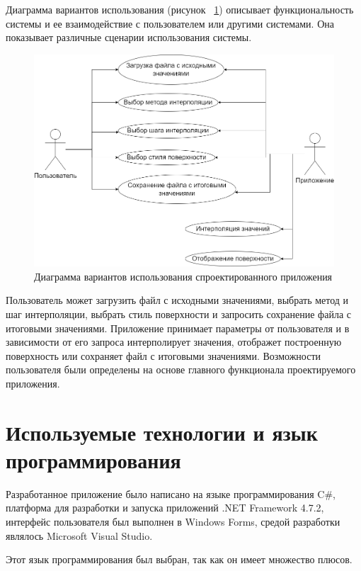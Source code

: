 Диаграмма вариантов использования (рисунок ~\ref{fig:13}) описывает функциональность системы и ее взаимодействие с пользователем или другими системами. Она показывает различные сценарии использования системы. 

\begin{figure}[h!]
    \center
    \includegraphics[scale=0.5]{images/Диаграмма вариантов использования.png}
    \caption{Диаграмма вариантов использования спроектированного приложения}
    \label{fig:13}
\end{figure}

Пользователь может загрузить файл с исходными значениями, выбрать метод и шаг интерполяции, выбрать стиль поверхности и запросить сохранение файла с итоговыми значениями. Приложение принимает параметры от пользователя и в зависимости от его запроса интерполирует значения, отображет построенную поверхность или сохраняет файл с итоговыми значениями. Возможности пользователя были определены на основе главного функционала проектируемого приложения.


\section{Используемые технологии и язык программирования}

Разработанное приложение было написано на языке программирования C\#, платформа для разработки и запуска приложений .NET Framework 4.7.2, интерфейс пользователя был выполнен в Windows Forms, средой разработки являлось Microsoft Visual Studio.

Этот язык программирования был выбран, так как он имеет множество плюсов. 


